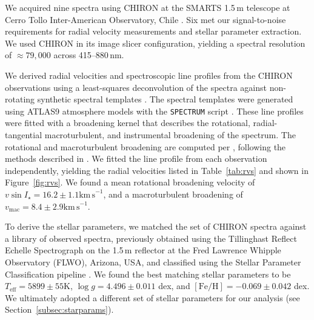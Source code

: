 \documentclass[12pt,twocolumn,tighten]{aastex63}
\begin{document}
We acquired nine spectra using CHIRON at the SMARTS 1.5$\,$m telescope
at Cerro Tollo Inter-American Observatory, Chile
\citep{tokovinin_chironfiber_2013}.  Six met our signal-to-noise
requirements for radial velocity measurements and stellar parameter
extraction.  We used CHIRON in its image slicer configuration,
yielding a spectral resolution of $\approx 79{,}000$ across
415--880$\,$nm.

We derived radial velocities and spectroscopic line profiles from the
CHIRON observations using a least-squares deconvolution of the spectra
against non-rotating synthetic spectral templates
\citep{donati_1997_spectropolarimetric}. The spectral templates were
generated using ATLAS9 atmosphere models \citep{Castelli:2004} with
the \texttt{SPECTRUM} script \citep{gray_1994_spectrum}. These line
profiles were fitted with a broadening kernel that describes the
rotational, radial-tangential macroturbulent, and instrumental
broadening of the spectrum. The rotational and macroturbulent
broadening are computed per \citet{gray_2005_book}, following the
methods described in \citet{zhou_2018_hd106315obliq}. We fitted the
line profile from each observation independently, yielding the radial
velocities listed in Table~\ref{tab:rvs} and shown in
Figure~\ref{fig:rvs}. We found a mean rotational broadening velocity
of $v\sin I_\star = 16.2 \pm 1.1 \mathrm{km\,s}^{-1}$, and a
macroturbulent broadening of $v_\mathrm{mac} = 8.4 \pm 2.9
\mathrm{km\,s}^{-1}$.

To derive the stellar parameters, we matched the set of CHIRON spectra
against a library of observed spectra, previously obtained using the
Tillinghast Reflect Echelle Spectrograph
\citep[TRES,][]{furesz_tres_2008} on the 1.5\,m reflector at the Fred
Lawrence Whipple Observatory (FLWO), Arizona, USA, and classified
using the Stellar Parameter Classification pipeline
\citep{buchhave_hatp16b_class_2010}.  We found the best matching
stellar parameters to be $T_\mathrm{eff} = 5899 \pm 55$K, $\log g =
4.496 \pm 0.011$ dex, and $\mathrm{[Fe/H]} = -0.069 \pm 0.042$ dex.
We ultimately adopted a different set of stellar parameters for our
analysis (see Section~\ref{subsec:starparams}).
\end{document}
